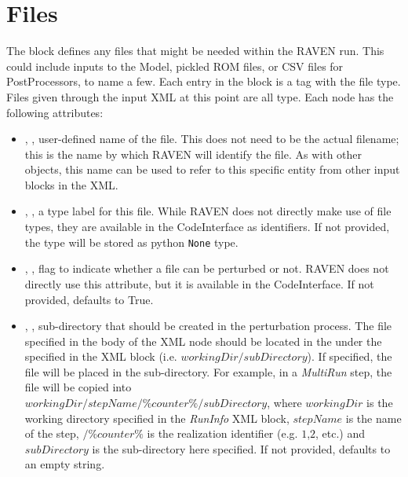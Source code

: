 \section{Files}
\label{sec:files}

The  block defines any files that might be needed within
the RAVEN run.  This could include inputs to the Model, pickled ROM files,
or CSV files for PostProcessors, to name a few.
%
Each entry in the  block is a tag with the file type.  Files
given through the input XML at this point are all  type.
Each  node has the following attributes:
\vspace{-5mm}
\begin{itemize}
  \itemsep0em
  \item {}, , user-defined name
  of the file.  This does not need to be the actual filename; this is the name
  by which RAVEN will identify the file.
  \nb As with other objects, this name can be used to refer to this
  specific entity from other input blocks in the XML.
  \item {}, , a type label
  for this file.  While RAVEN does not directly make use of file types,
  they are available in the CodeInterface as identifiers.  If not provided,
  the type will be stored as python \texttt{None} type.

  \item {}, , flag
  to indicate whether a file can be perturbed or not. RAVEN does not
  directly use this attribute, but it is available in the CodeInterface.
  If not provided, defaults to True.
  
  \item {}, , sub-directory
  that should be created in the perturbation process. The file specified in the body of the 
  XML node should be located in the   under the   specified
  in the  XML block (i.e. $workingDir/subDirectory$).
  If specified, the file will be
  placed in the sub-directory. For example, in a \textit{MultiRun} step, 
  the file will be copied into \\$workingDir/stepName/\%counter\%/subDirectory$, where $workingDir$
  is the working directory specified in the \textit{RunInfo} XML block, $stepName$ is the name of the step, 
  $/\%counter\%$ is the realization identifier (e.g. $1$,$2$, etc.) and $subDirectory$ is the sub-directory here
  specified.
  If not provided, defaults to an empty string.
\end{itemize}
